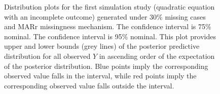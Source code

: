 \documentclass[12pt, fullpage, a4paper]{article}
\begin{document}
\begin{figure}[ht!]
\begin{center}
{{			}
		}
	\end{center}
	\caption{Distribution plots for the first simulation study (quadratic equation with an incomplete outcome) generated under 30\% missing cases and MARr missingness mechanism. The confidence interval is 75\% nominal. The confidence interval is 95\% nominal. This plot provides upper and lower bounds (grey lines) of the posterior predictive distribution for all observed $Y$ in ascending order of the expectation of the posterior distribution. Blue points imply the corresponding observed value falls in the interval, while red points imply the corresponding observed value falls outside the interval.}
	\label{fig6_4}
\end{figure}

\begin{figure}
	\begin{center}
\end{center}
\end{figure}
\end{document}
